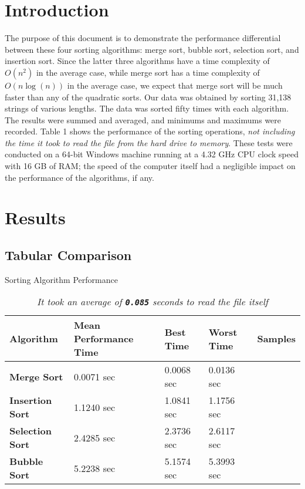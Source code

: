 


	
	\section{Introduction}
	The purpose of this document is to demonstrate the performance differential between these four sorting algorithms: merge sort, bubble sort, selection sort, and insertion sort. Since the latter three algorithms have a time complexity of $O(n^2)$ in the average case, while merge sort has a time complexity of $O(n \log(n))$ in the average case, we expect that merge sort will be much faster than any of the quadratic sorts. Our data was obtained by sorting 31,138 strings of various lengths. The data was sorted fifty times with each algorithm. The results were summed and averaged, and minimums and maximums were recorded. Table 1 shows the performance of the sorting operations, \emph{not including the time it took to read the file from the hard drive to memory}. These tests were conducted on a 64-bit Windows machine running at a 4.32 GHz CPU clock	speed with 16 GB of RAM; the speed of the computer itself had a negligible impact on the performance of the algorithms, if any.\\
	\section{Results}
	\subsection{Tabular Comparison}
	\begin{table}[h]
		\centering
		\caption{Sorting Algorithm Performance}
		\begin{tabu}{|l|l|l|l|c|}
			\hline
			\rowfont{\itshape} Algorithm & Mean Performance Time & Best Time & Worst Time & Samples \\ \hline
			\rowfont{\ttfamily}\textbf{Merge Sort} & 0.0071 sec & 0.0068 sec & 0.0136 sec &  \\ 
			\rowfont{\ttfamily}\textbf{Insertion Sort} & 1.1240 sec & 1.0841 sec & 1.1756 sec &  \\ 
			\rowfont{\ttfamily}\textbf{Selection Sort} & 2.4285 sec & 2.3736 sec & 2.6117 sec &  \\ 
			\rowfont{\ttfamily}\textbf{Bubble Sort} & 5.2238 sec & 5.1574 sec & 5.3993 sec &  \\ \hline
		\end{tabu}
		\caption*{\emph{It took an average of \texttt{\textbf{0.085}} seconds to read the file itself}}
	\end{table}

